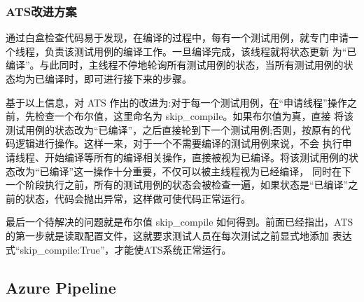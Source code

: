 \documentclass[UTF8]{ctexart}
\begin{document}
\subsubsection{ATS改进方案}
通过白盒检查代码易于发现，在编译的过程中，每有一个测试用例，就专门申请一个线程，负责该测试用例的编译工作。一旦编译完成，该线程就将状态更新
为“已编译”。与此同时，主线程不停地轮询所有测试用例的状态，当所有测试用例的状态均为已编译时，即可进行接下来的步骤。
\par
基于以上信息，对 ATS 作出的改进为:对于每一个测试用例，在“申请线程”操作之前，先检查一个布尔值，这里命名为 skip\_compile。如果布尔值为真，直接
将该测试用例的状态改为“已编译”，之后直接轮到下一个测试用例;否则，按原有的代码逻辑进行操作。这样一来，对于一个不需要编译的测试用例来说，不会
执行申请线程、开始编译等所有的编译相关操作，直接被视为已编译。将该测试用例的状态改为“已编译”这一操作十分重要，不仅可以被主线程视为已经编译，
同时在下一个阶段执行之前，所有的测试用例的状态会被检查一遍，如果状态是“已编译”之前的状态，代码会抛出异常，这样做可使代码正常运行。
\par
最后一个待解决的问题就是布尔值 skip\_compile 如何得到。前面已经指出，ATS 的第一步就是读取配置文件，这就要求测试人员在每次测试之前显式地添加
表达式“skip\_compile:True”，才能使ATS系统正常运行。

\subsection{Azure Pipeline}

%
\end{document}
